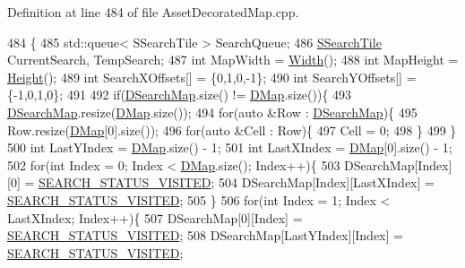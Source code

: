 Definition at line 484 of file Asset\+Decorated\+Map.\+cpp.


\begin{DoxyCode}
484                                                                                               \{
485     std::queue< SSearchTile > SearchQueue;
486     \hyperlink{structSSearchTile}{SSearchTile} CurrentSearch, TempSearch;
487     \textcolor{keywordtype}{int} MapWidth = \hyperlink{classCTerrainMap_a34cb754aa9b26e85a73377159f2527d7}{Width}();
488     \textcolor{keywordtype}{int} MapHeight = \hyperlink{classCTerrainMap_ae5e4bf6507e0e3e9ac0322b43eed8a7a}{Height}();
489     \textcolor{keywordtype}{int} SearchXOffsets[] = \{0,1,0,-1\};
490     \textcolor{keywordtype}{int} SearchYOffsets[] = \{-1,0,1,0\};
491     
492     \textcolor{keywordflow}{if}(\hyperlink{classCAssetDecoratedMap_a7e6c8b62a9f83cec4bc77dc833d5787a}{DSearchMap}.size() != \hyperlink{classCTerrainMap_a80d154ce478948b10473534a7bca13f6}{DMap}.size())\{
493         \hyperlink{classCAssetDecoratedMap_a7e6c8b62a9f83cec4bc77dc833d5787a}{DSearchMap}.resize(\hyperlink{classCTerrainMap_a80d154ce478948b10473534a7bca13f6}{DMap}.size());
494         \textcolor{keywordflow}{for}(\textcolor{keyword}{auto} &Row : \hyperlink{classCAssetDecoratedMap_a7e6c8b62a9f83cec4bc77dc833d5787a}{DSearchMap})\{
495             Row.resize(\hyperlink{classCTerrainMap_a80d154ce478948b10473534a7bca13f6}{DMap}[0].size());
496             \textcolor{keywordflow}{for}(\textcolor{keyword}{auto} &Cell : Row)\{
497                 Cell = 0;
498             \}
499         \}
500         \textcolor{keywordtype}{int} LastYIndex = \hyperlink{classCTerrainMap_a80d154ce478948b10473534a7bca13f6}{DMap}.size() - 1;
501         \textcolor{keywordtype}{int} LastXIndex = \hyperlink{classCTerrainMap_a80d154ce478948b10473534a7bca13f6}{DMap}[0].size() - 1;
502         \textcolor{keywordflow}{for}(\textcolor{keywordtype}{int} Index = 0; Index < \hyperlink{classCTerrainMap_a80d154ce478948b10473534a7bca13f6}{DMap}.size(); Index++)\{
503             DSearchMap[Index][0] = \hyperlink{AssetDecoratedMap_8cpp_ae8b1ae5dd44be7811fb48e54c1194503}{SEARCH\_STATUS\_VISITED};
504             DSearchMap[Index][LastXIndex] = \hyperlink{AssetDecoratedMap_8cpp_ae8b1ae5dd44be7811fb48e54c1194503}{SEARCH\_STATUS\_VISITED}; 
505         \}
506         \textcolor{keywordflow}{for}(\textcolor{keywordtype}{int} Index = 1; Index < LastXIndex; Index++)\{
507             DSearchMap[0][Index] = \hyperlink{AssetDecoratedMap_8cpp_ae8b1ae5dd44be7811fb48e54c1194503}{SEARCH\_STATUS\_VISITED};
508             DSearchMap[LastYIndex][Index] = \hyperlink{AssetDecoratedMap_8cpp_ae8b1ae5dd44be7811fb48e54c1194503}{SEARCH\_STATUS\_VISITED};

\end{DoxyCode}
